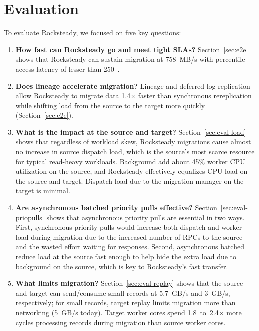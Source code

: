 \section{Evaluation}
\label{sec:reval}

To evaluate Rocksteady, we focused on five key questions:
\begin{enumerate}
\item {\bf How fast can Rocksteady go and meet tight SLAs?}
  Section~\ref{sec:e2e} shows that Rocksteady can sustain migration at
    758~MB/s with \nnnth percentile access latency of lesser than 250~\us.
\item {\bf Does lineage accelerate migration?}
  Lineage and deferred log replication allow Rocksteady to migrate data
    1.4$\times$ faster than synchronous rereplication while shifting
    load from the source to the target more quickly (Section~\ref{sec:e2e}).
\item {\bf What is the impact at the source and target?}
  Section~\ref{sec:eval-load} shows that regardless of workload skew, Rocksteady
    migrations cause almost no increase in source dispatch load, which is the source's
    most scarce resource for typical read-heavy workloads. Background \pulls
    add about 45\% worker CPU utilization on the source, and Rocksteady
    effectively equalizes CPU load on the source and target.
    Dispatch load due to the migration manager on the target is minimal.
\item {\bf Are asynchronous batched priority pulls effective?}
  Section~\ref{sec:eval-priopulls} shows that asynchronous priority pulls are
    essential in two ways. First, synchronous priority pulls would increase both
    dispatch and worker load during migration due to the increased number of
    RPCs to the source and the wasted effort waiting for \priopull responses. Second,
    asynchronous batched \priopulls reduce load at the source fast enough to help
    hide the extra load due to background \pulls on the source, which is key to
    Rocksteady's fast transfer.
\item {\bf What limits migration?}
  Section~\ref{sec:eval-replay} shows that the source and target can send/consume
    small records at 5.7~GB/s and 3~GB/s, respectively; for small
    records,
    target replay limits migration more than
    networking (5~GB/s today).
    Target worker cores spend 1.8~to~2.4$\times$ more cycles
    processing records during migration than source worker cores.


\end{enumerate}
